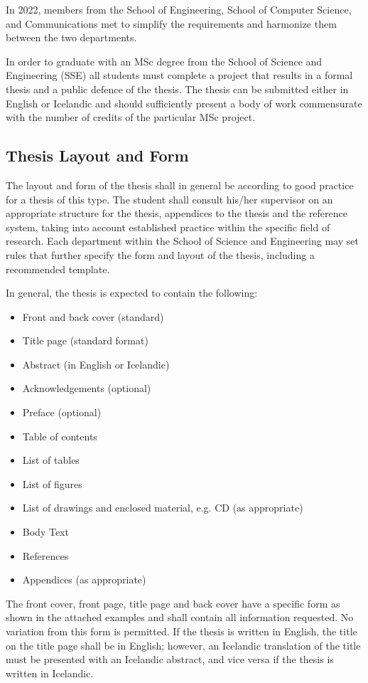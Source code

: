 In 2022, members from the School of Engineering, School of Computer Science, and Communications met to simplify the requirements and harmonize them between the two departments.

In order to graduate with an MSc degree from the School of Science and Engineering (SSE) all students must complete a project that results in a formal thesis and a public defence of the thesis.
The thesis can be submitted either in English or Icelandic and should sufficiently present a body of work commensurate with the number of credits of the particular MSc project.

\subsection{Thesis Layout and Form}
The layout and form of the thesis shall in general be according to good practice for a thesis of this type. The student shall consult his/her supervisor on an appropriate structure for the thesis, appendices to the thesis and the reference system, taking into account established practice within the specific field of research. Each department within the School of Science and Engineering may set rules that further specify the form and layout of the thesis, including a recommended template.

In general, the thesis is expected to contain the following:
\begin{itemize}
\item Front and back cover (standard)
\item Title page (standard format)
\item Abstract (in English or Icelandic)
\item Acknowledgements (optional)
\item Preface (optional)
\item Table of contents
\item List of tables
\item List of figures
\item List of drawings and enclosed material, e.g. CD (as appropriate)
\item Body Text
\item References
\item Appendices (as appropriate)
\end{itemize}

The front cover, front page, title page and back cover have a specific form as shown in the attached examples and shall contain all information requested.
No variation from this form is permitted.
If the thesis is written in English, the title on the title page shall be in English; however, an Icelandic translation of the title must be presented with an Icelandic abstract, and vice versa if the thesis is written in Icelandic.

